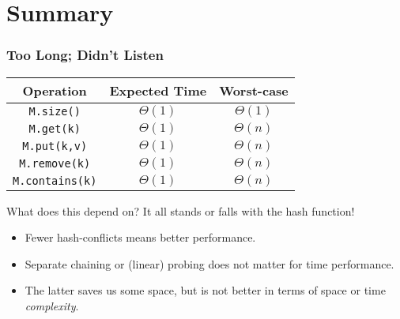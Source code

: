 \section{Summary}%
\label{sec:summary}

\begin{frame}
	\frametitle{Too Long; Didn't Listen}
	
	\begin{center}
		\begin{tabular}{c | c | c}
			Operation & Expected Time & Worst-case \\
			\midrule
			\texttt{M.size()} & $\Theta(1)$& $\Theta(1)$\\
			\texttt{M.get(k)}  & $\Theta(1)$& $\Theta(n)$\\
			\texttt{M.put(k,v)} & $\Theta(1)$& $\Theta(n)$\\
			\texttt{M.remove(k)} & $\Theta(1)$& $\Theta(n)$\\
			\texttt{M.contains(k)} & $\Theta(1)$& $\Theta(n)$\\
		\end{tabular}
	\end{center}
		\begin{block}{What does this depend on?}
			It all stands or falls with the hash function!
			\begin{itemize}
				\item Fewer hash-conflicts means better performance.
				\item Separate chaining or (linear) probing does not matter for time performance.
				\item The latter saves us some space, but is not better in terms of space or time \textit{complexity}.
			\end{itemize}
		\end{block}	
\end{frame}

